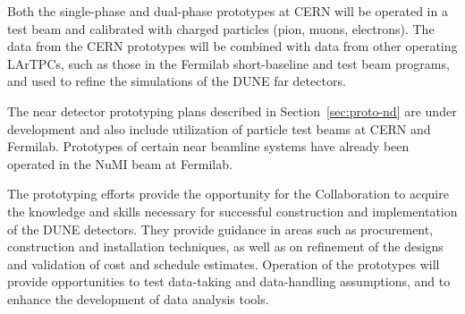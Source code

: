Both the single-phase and dual-phase prototypes at CERN will be operated in a test beam and calibrated with charged particles (pion, muons, electrons). The data from the CERN
prototypes will be combined with data from other operating LArTPCs, such as those in the Fermilab short-baseline and test beam programs, and used to refine the simulations of the DUNE far detectors.  

The near detector prototyping plans described in Section~\ref{sec:proto-nd} are under development and also %
include utilization of particle test beams at CERN and Fermilab.  Prototypes of certain near beamline  systems have already been operated in the NuMI beam at Fermilab.

The prototyping efforts provide the opportunity for the Collaboration to acquire the knowledge and skills necessary for successful construction and implementation of the DUNE detectors. They provide guidance  %
 in areas such as procurement, construction and installation techniques, as well as on refinement of the designs and validation of cost and schedule estimates.  Operation of the %
prototypes will provide  opportunities to test data-taking and data-handling assumptions, and to enhance the development of data analysis tools.  %


